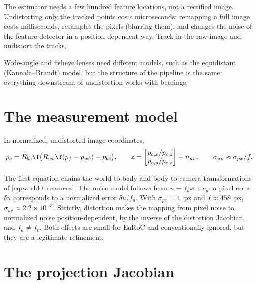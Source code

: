 \begin{keyidea}
The estimator needs a few hundred feature locations, not a rectified image. Undistorting only the tracked points
costs microseconds; remapping a full image costs milliseconds, resamples the pixels (blurring them), and changes
the noise of the feature detector in a position-dependent way. Track in the raw image and undistort the tracks.
\end{keyidea}

Wide-angle and fisheye lenses need different models, such as the equidistant (Kannala--Brandt) model, but the
structure of the pipeline is the same: everything downstream of undistortion works with bearings.

\section{The measurement model}

\begin{convention}
In normalized, undistorted image coordinates,
\begin{equation}
  p_c = R_{bc}\T\big(R_{wb}\T(p_f - p_{wb}) - p_{bc}\big), \qquad
  z = \begin{bmatrix} p_{c,x}/p_{c,z} \\ p_{c,y}/p_{c,z} \end{bmatrix} + n_{uv},
  \qquad \sigma_{uv} \approx \sigma_{px}/f .
\end{equation}
\end{convention}

The first equation chains the world-to-body and body-to-camera transformations of \eqref{eq:world-to-camera}. The noise
model follows from $u = f_u x + c_u$: a pixel error $\delta u$ corresponds to a normalized error $\delta u/f_u$. With
$\sigma_{px} = 1$~px and $f \approx 458$~px, $\sigma_{uv} \approx 2.2\times10^{-3}$. Strictly, distortion makes the mapping
from pixel noise to normalized noise position-dependent, by the inverse of the distortion Jacobian, and $f_u \neq f_v$.
Both effects are small for EuRoC and conventionally ignored, but they are a legitimate refinement.

\section{The projection Jacobian}

